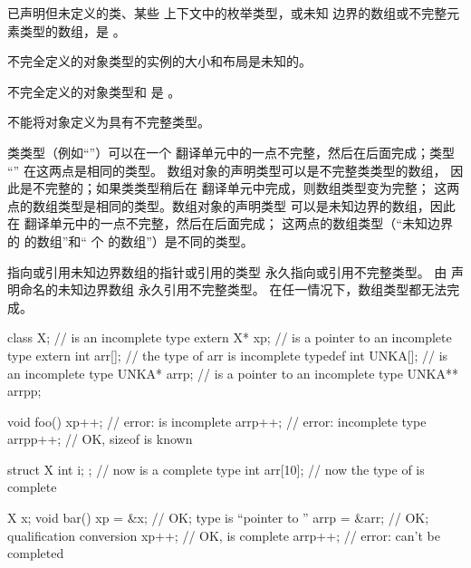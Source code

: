 \pnum
{}%
已声明但未定义的类、某些
上下文中的枚举类型，或未知
边界的数组或不完整元素类型的数组，是
。
\begin{footnote}
不完全定义的对象类型的实例的大小和布局是未知的。
\end{footnote}
\label{term.incomplete.type}%
不完全定义的对象类型和 \cv{}  是
。
\begin{note}
不能将对象定义为具有不完整类型。
\end{note}

\pnum
类类型（例如“”）可以在一个
翻译单元中的一点不完整，然后在后面完成；类型
“” 在这两点是相同的类型。
数组对象的声明类型可以是不完整类类型的数组，
因此是不完整的；如果类类型稍后在
翻译单元中完成，则数组类型变为完整；
这两点的数组类型是相同的类型。数组对象的声明类型
可以是未知边界的数组，因此在
翻译单元中的一点不完整，然后在后面完成；
这两点的数组类型（“未知边界的  的数组”和“ 个  的数组”）是不同的类型。
\begin{note}
指向或引用未知边界数组的指针或引用的类型
永久指向或引用不完整类型。
由  声明命名的未知边界数组
永久引用不完整类型。
在任一情况下，数组类型都无法完成。
\end{note}
\begin{example}
%
\begin{codeblock}
class X;                        //  is an incomplete type
extern X* xp;                   //  is a pointer to an incomplete type
extern int arr[];               // the type of arr is incomplete
typedef int UNKA[];             //  is an incomplete type
UNKA* arrp;                     //  is a pointer to an incomplete type
UNKA** arrpp;

void foo() {
  xp++;                         // error:  is incomplete
  arrp++;                       // error: incomplete type
  arrpp++;                      // OK, sizeof  is known
}

struct X { int i; };            // now  is a complete type
int arr[10];                    // now the type of  is complete

X x;
void bar() {
  xp = &x;                      // OK; type is ``pointer to ''
  arrp = &arr;                  // OK; qualification conversion
  xp++;                         // OK,  is complete
  arrp++;                       // error:  can't be completed
}
\end{codeblock}
\end{example}


